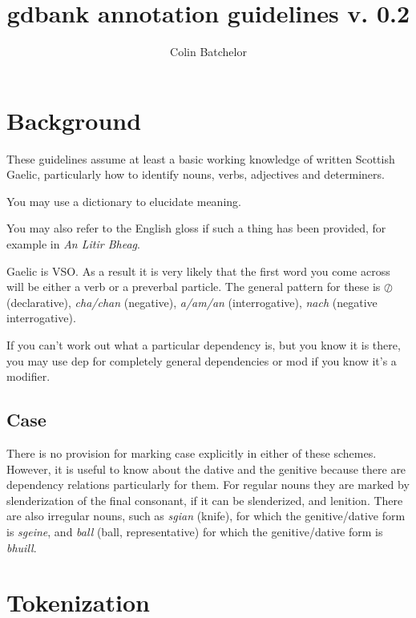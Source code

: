 \documentclass[a4paper]{article}
\begin{document}
\title{gdbank annotation guidelines v. 0.2}
\author{Colin Batchelor}
\maketitle

\section{Background}

These guidelines assume at least a basic working knowledge of written Scottish Gaelic, particularly how to identify nouns, verbs, adjectives and determiners.

 You may use a dictionary to elucidate meaning.

 You may also refer to the English gloss if such a thing has been provided, for example in {\it An Litir Bheag}.

 Gaelic is VSO. As a result it is very likely that the first word you come across will be either a verb or a preverbal particle.
The general pattern for these is $\oslash$ (declarative), \textit{cha/chan} (negative), \textit{a/am/an} (interrogative), \textit{nach} (negative interrogative).

 If you can't work out what a particular dependency is, but you know it is there, you may use dep for completely general dependencies or mod if you know it's a modifier.



\subsection{Case}

There is no provision for marking case explicitly in either of these schemes.
However, it is useful to know about the dative and the genitive because there are dependency relations particularly for them.
For regular nouns they are marked by slenderization of the final consonant, if it can be slenderized, and lenition.
There are also irregular nouns, such as \textit{sgian} (knife), for which the genitive/dative form is \textit{sgeine}, and \textit{ball} (ball, representative) for which the genitive/dative form is \textit{bhuill}.

\section{Tokenization}
\end{document}
